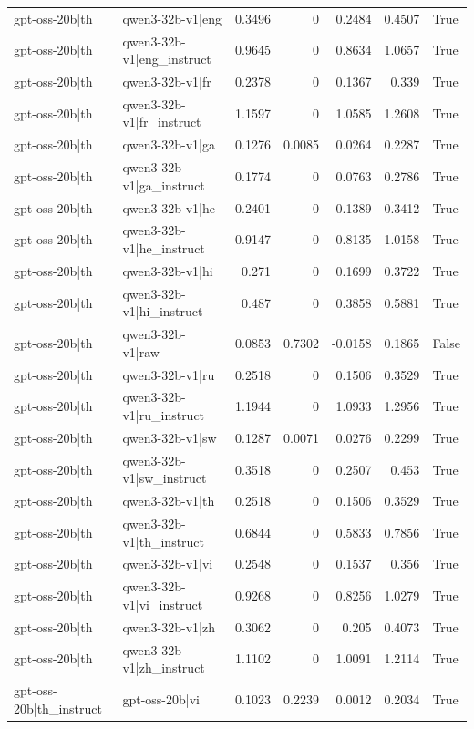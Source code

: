 \begin{table}
\begin{tabular}{l l r r r r l}
gpt-oss-20b|th & qwen3-32b-v1|eng & 0.3496 & 0 & 0.2484 & 0.4507 & True \\
gpt-oss-20b|th & qwen3-32b-v1|eng_instruct & 0.9645 & 0 & 0.8634 & 1.0657 & True \\
gpt-oss-20b|th & qwen3-32b-v1|fr & 0.2378 & 0 & 0.1367 & 0.339 & True \\
gpt-oss-20b|th & qwen3-32b-v1|fr_instruct & 1.1597 & 0 & 1.0585 & 1.2608 & True \\
gpt-oss-20b|th & qwen3-32b-v1|ga & 0.1276 & 0.0085 & 0.0264 & 0.2287 & True \\
gpt-oss-20b|th & qwen3-32b-v1|ga_instruct & 0.1774 & 0 & 0.0763 & 0.2786 & True \\
gpt-oss-20b|th & qwen3-32b-v1|he & 0.2401 & 0 & 0.1389 & 0.3412 & True \\
gpt-oss-20b|th & qwen3-32b-v1|he_instruct & 0.9147 & 0 & 0.8135 & 1.0158 & True \\
gpt-oss-20b|th & qwen3-32b-v1|hi & 0.271 & 0 & 0.1699 & 0.3722 & True \\
gpt-oss-20b|th & qwen3-32b-v1|hi_instruct & 0.487 & 0 & 0.3858 & 0.5881 & True \\
gpt-oss-20b|th & qwen3-32b-v1|raw & 0.0853 & 0.7302 & -0.0158 & 0.1865 & False \\
gpt-oss-20b|th & qwen3-32b-v1|ru & 0.2518 & 0 & 0.1506 & 0.3529 & True \\
gpt-oss-20b|th & qwen3-32b-v1|ru_instruct & 1.1944 & 0 & 1.0933 & 1.2956 & True \\
gpt-oss-20b|th & qwen3-32b-v1|sw & 0.1287 & 0.0071 & 0.0276 & 0.2299 & True \\
gpt-oss-20b|th & qwen3-32b-v1|sw_instruct & 0.3518 & 0 & 0.2507 & 0.453 & True \\
gpt-oss-20b|th & qwen3-32b-v1|th & 0.2518 & 0 & 0.1506 & 0.3529 & True \\
gpt-oss-20b|th & qwen3-32b-v1|th_instruct & 0.6844 & 0 & 0.5833 & 0.7856 & True \\
gpt-oss-20b|th & qwen3-32b-v1|vi & 0.2548 & 0 & 0.1537 & 0.356 & True \\
gpt-oss-20b|th & qwen3-32b-v1|vi_instruct & 0.9268 & 0 & 0.8256 & 1.0279 & True \\
gpt-oss-20b|th & qwen3-32b-v1|zh & 0.3062 & 0 & 0.205 & 0.4073 & True \\
gpt-oss-20b|th & qwen3-32b-v1|zh_instruct & 1.1102 & 0 & 1.0091 & 1.2114 & True \\
gpt-oss-20b|th_instruct & gpt-oss-20b|vi & 0.1023 & 0.2239 & 0.0012 & 0.2034 & True \\

\end{tabular}
\end{table}
